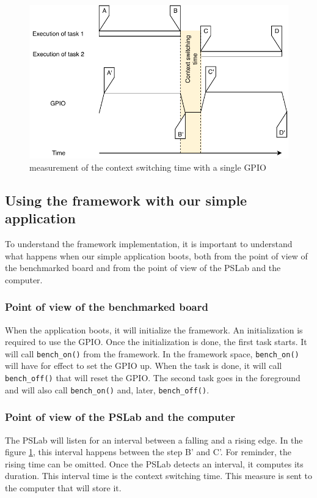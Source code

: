 \begin{figure}[!ht]
  \centering
  \includegraphics[scale=1]{assets/external-framework-context-switching-time-measurement.pdf}
  \caption{\label{fig:external-framework-context-switching-time-measurement}measurement of the context switching time with a single GPIO}
\end{figure}

\subsection{Using the framework with our simple application}

To understand the framework implementation, it is important to understand what happens when our simple application boots, 
  both from the point of view of the benchmarked board and from the point of view of the PSLab and the computer.

\subsubsection{Point of view of the benchmarked board}
When the application boots, it will initialize the framework.
An initialization is required to use the GPIO.
Once the initialization is done, the first task starts.
It will call \texttt{bench\_on()} from the framework.
In the framework space, \texttt{bench\_on()} will have for effect to set the GPIO up.
When the task is done, it will call \texttt{bench\_off()} that will reset the GPIO.
The second task goes in the foreground and will also call \texttt{bench\_on()} and, later, \texttt{bench\_off()}.

\subsubsection{Point of view of the PSLab and the computer}
The PSLab will listen for an interval between a falling and a rising edge.
In the figure \ref{fig:external-framework-context-switching-time-measurement}, this interval happens between the step B' and C'.
For reminder, the rising time can be omitted.
Once the PSLab detects an interval, it computes its duration.
This interval time is the context switching time.
This measure is sent to the computer that will store it.


